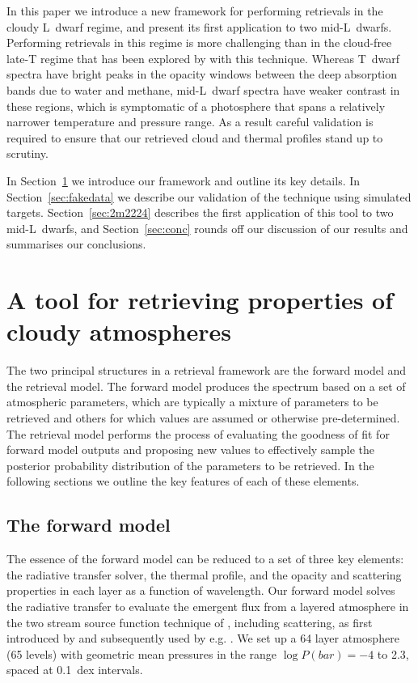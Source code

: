\documentclass[useAMS,usenatbib]{mn2e}
\begin{document}
In this paper we introduce a new framework for performing retrievals in the cloudy L~dwarf regime, and present its first application to two mid-L~dwarfs. Performing retrievals in this regime is more challenging than in the cloud-free late-T regime that has been explored by \citet{line2014,line2015} with this technique. Whereas T~dwarf spectra have bright peaks in the opacity windows between the deep absorption bands due to water and methane, mid-L~dwarf spectra have weaker contrast in these regions, which is symptomatic of a photosphere that spans a relatively narrower temperature and pressure range. As a result careful validation is required to ensure that our retrieved cloud and thermal profiles stand up to scrutiny.  

In Section~\ref{sec:brew} we introduce our framework and outline its key details. In Section~\ref{sec:fakedata} we describe our validation of the technique using simulated targets. Section~\ref{sec:2m2224} describes the first application of this tool to two mid-L~dwarfs, and Section~\ref{sec:conc} rounds off our discussion of our results and summarises our conclusions. 

\section{A tool for retrieving properties of cloudy atmospheres}
\label{sec:brew}

The two principal structures in a retrieval framework are the forward model and the retrieval model. The forward model produces the spectrum based on a set of atmospheric parameters, which are typically a mixture of parameters to be retrieved and others for which values are assumed or otherwise pre-determined. The retrieval model performs the process of evaluating the goodness of fit for forward model outputs and proposing new values to effectively sample the posterior probability distribution of the parameters to be retrieved. In the following sections we outline the key features of each of these elements. 


\subsection{The forward model}
\label{subsec:forward}

The essence of the forward model can be reduced to a set of three key elements: the radiative transfer solver, the thermal profile, and the opacity and scattering properties in each layer as a function of wavelength. 
Our forward model solves the radiative transfer to evaluate the emergent flux from a layered atmosphere in the two stream source function technique of \citet{toon1989}, including scattering, as first introduced by \citet{mckay1989} and subsequently used by e.g. \citet{marley1996,sm08,morley2012}. We set up a 64 layer atmosphere (65 levels) with geometric mean pressures in the range $\log P(bar) = -4$ to 2.3, spaced at 0.1~dex intervals.  
\end{document}
